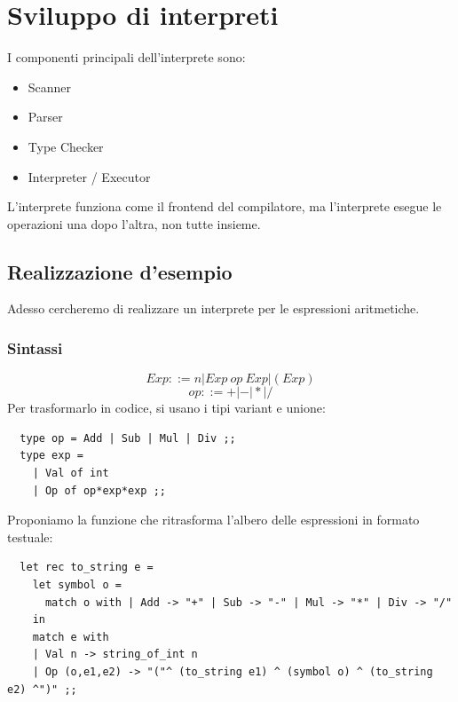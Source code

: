 \documentclass[12pt,a4paper]{article}
\let\oldsection\section
\renewcommand{\section}{\clearpage\oldsection}
\begin{document}
\section{Sviluppo di interpreti}
I componenti principali dell'interprete sono:
\begin{itemize}
  \item Scanner
  \item Parser
  \item Type Checker
  \item Interpreter / Executor
\end{itemize}
L'interprete funziona come il frontend del compilatore, ma l'interprete esegue le operazioni una dopo l'altra, non tutte insieme.
\subsection{Realizzazione d'esempio}
Adesso cercheremo di realizzare un interprete per le espressioni aritmetiche.\\
\subsubsection{Sintassi}
\[
Exp ::= n | Exp\ op\ Exp | (Exp)
\]
\[
op ::= + | - | * | /
\]
Per trasformarlo in codice, si usano i tipi variant e unione:
\begin{lstlisting}
  type op = Add | Sub | Mul | Div ;;
  type exp =
    | Val of int
    | Op of op*exp*exp ;;
\end{lstlisting}
Proponiamo la funzione che ritrasforma l'albero delle espressioni in formato testuale:
\begin{lstlisting}
  let rec to_string e =
    let symbol o =
      match o with | Add -> "+" | Sub -> "-" | Mul -> "*" | Div -> "/"
    in
    match e with
    | Val n -> string_of_int n
    | Op (o,e1,e2) -> "("^ (to_string e1) ^ (symbol o) ^ (to_string e2) ^")" ;;
\end{lstlisting}
\end{document}
